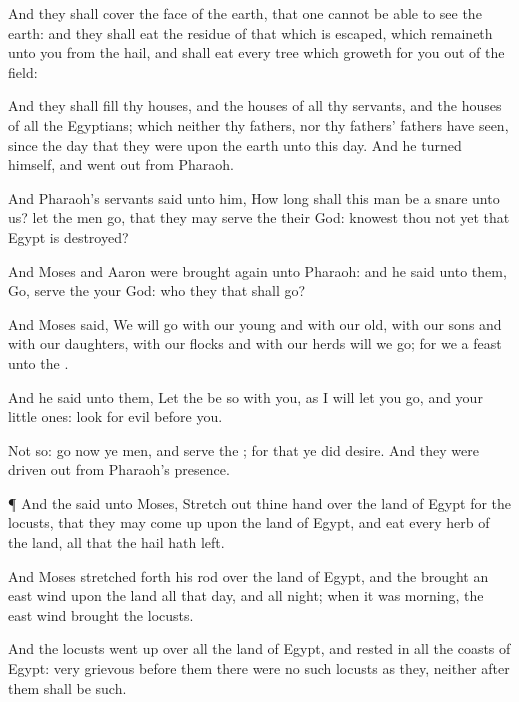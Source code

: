 {And they shall
cover the
face of the
earth, that one cannot be
able to
see the
earth: and they shall
eat the
residue of that which is
escaped, which
remaineth unto you from the
hail, and shall
eat every
tree which
groweth for you out of the
field:

And they shall
fill thy
houses, and the
houses of all thy
servants, and the
houses of all the
Egyptians; which neither thy
fathers, nor thy
fathers’
fathers have
seen, since the
day that they were upon the
earth unto this
day. And he
turned himself, and went
out from
Pharaoh.

And
Pharaoh’s
servants
said unto him, How long shall this man be a
snare unto us? let the
men
go, that they may
serve the
{} their
God:
knowest thou not
yet that
Egypt is
destroyed?

And
Moses and
Aaron were brought
again unto
Pharaoh: and he
said unto them,
Go,
serve the
{} your
God:
{} who
{} they that shall
go?

And
Moses
said, We will
go with our
young and with our
old, with our
sons and with our
daughters, with our
flocks and with our
herds will we
go; for we
{} a
feast unto the
{}.

And he
said unto them, Let the
{} be so with you, as I will let you
go, and your little
ones:
look
{} for
evil
{}
before you.

Not so:
go now ye
{}
men, and
serve the
{}; for that ye did
desire. And they were driven
out from
Pharaoh’s
presence.


\par }{\PP {}¶ And the
{}
said unto
Moses, Stretch
out thine
hand over the
land of
Egypt for the
locusts, that they may come
up upon the
land of
Egypt, and
eat every
herb of the
land,
{} all that the
hail hath
left.

And
Moses stretched
forth his
rod over the
land of
Egypt, and the
{}
brought an
east
wind upon the
land all that
day, and all
{}
night;
{} when it was
morning, the
east
wind
brought the
locusts.

And the
locusts went
up over all the
land of
Egypt, and
rested in all the
coasts of
Egypt:
very
grievous
{}
before them there were no
such
locusts as they, neither
after them shall be such.

}
